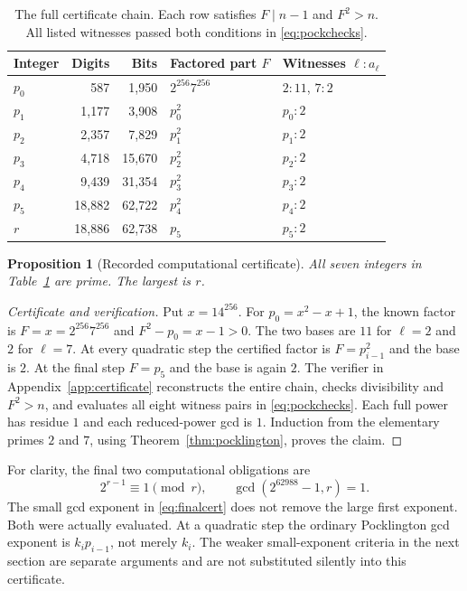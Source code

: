 \documentclass[11pt,a4paper]{article}
\newtheorem{proposition}[theorem]{Proposition}
\theoremstyle{definition}
\begin{document}
\begin{table}[htbp]
\centering\small
\caption{The full certificate chain. Each row satisfies $F\mid n-1$ and
$F^2>n$. All listed witnesses passed both conditions in
\eqref{eq:pockchecks}.}
\label{tab:chain}
\begin{tabular}{@{}l r r l l@{}}
\toprule
Integer & Digits & Bits & Factored part $F$ & Witnesses $\ell:a_\ell$\\
\midrule
$p_0$ & 587 & 1,950 & $2^{256}7^{256}$ & $2:11$, $7:2$\\
$p_1$ & 1,177 & 3,908 & $p_0^2$ & $p_0:2$\\
$p_2$ & 2,357 & 7,829 & $p_1^2$ & $p_1:2$\\
$p_3$ & 4,718 & 15,670 & $p_2^2$ & $p_2:2$\\
$p_4$ & 9,439 & 31,354 & $p_3^2$ & $p_3:2$\\
$p_5$ & 18,882 & 62,722 & $p_4^2$ & $p_4:2$\\
$r$ & 18,886 & 62,738 & $p_5$ & $p_5:2$\\
\bottomrule
\end{tabular}
\end{table}

\begin{proposition}[Recorded computational certificate]\label{prop:record}
All seven integers in Table~\ref{tab:chain} are prime. The largest is $r$.
\end{proposition}

\begin{proof}[Certificate and verification]
Put $x=14^{256}$. For $p_0=x^2-x+1$, the known factor is
$F=x=2^{256}7^{256}$ and $F^2-p_0=x-1>0$. The two bases are $11$ for
$\ell=2$ and $2$ for $\ell=7$. At every quadratic step the certified factor
is $F=p_{i-1}^2$ and the base is $2$. At the final step $F=p_5$ and the
base is again $2$. The verifier in Appendix~\ref{app:certificate} reconstructs
the entire chain, checks divisibility and $F^2>n$, and evaluates all eight
witness pairs in \eqref{eq:pockchecks}. Each full power has residue $1$ and
each reduced-power gcd is $1$. Induction from the elementary primes $2$
and $7$, using Theorem~\ref{thm:pocklington}, proves the claim.
\end{proof}

For clarity, the final two computational obligations are
\begin{equation}\label{eq:finalcert}
 2^{r-1}\equiv1\pmod r,
 \qquad \gcd(2^{62988}-1,r)=1.
\end{equation}
The small gcd exponent in \eqref{eq:finalcert} does not remove the large
first exponent. Both were actually evaluated. At a quadratic step the
ordinary Pocklington gcd exponent is $k_i p_{i-1}$, not merely $k_i$.
The weaker small-exponent criteria in the next section are separate
arguments and are not substituted silently into this certificate.
\end{document}

